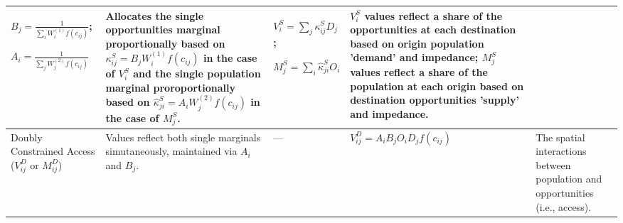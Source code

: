 {\begin{longtable}{|p{2.5cm}|p{2.5cm}|p{2.5cm}|p{3cm}|p{3cm}|}
$B_j = \frac{1}{\sum_i W_i^{(1)} f(c_{ij})}$;

$A_i = \frac{1}{\sum_j W_j^{(2)} f(c_{ij})}$

& Allocates the single opportunities marginal proportionally based on $\kappa^S_{ij} =  B_j W_i^{(1)} f(c_{ij})$ in the case of $V_i^S$ and the single population marginal proroportionally based on $\hat \kappa^S_{ji} = A_i W_j^{(2)} f(c_{ij})$ in the case of $M_j^S$.

& $V^S_i = \sum_j \kappa^S_{ij} D_j$;

$M_j^S =  \sum_i \hat \kappa^S_{ji} O_i$

& $V^S_i$ values reflect a share of the opportunities at each destination based on origin population 'demand' and impedance; $M^S_j$ values reflect a share of the population at each origin based on destination opportunities 'supply' and impedance.\\
\hline

Doubly Constrained Access ($V_{ij}^D$ or $M_{ij}^D$)
& Values reflect both single marginals simutaneously, maintained via $A_i$ and $B_j$.
& —
& $V_{ij}^D = A_i B_j O_i D_j f(c_{ij})$
& The spatial interactions between population and opportunities (i.e., access). \\
\hline

\end{longtable}
}
